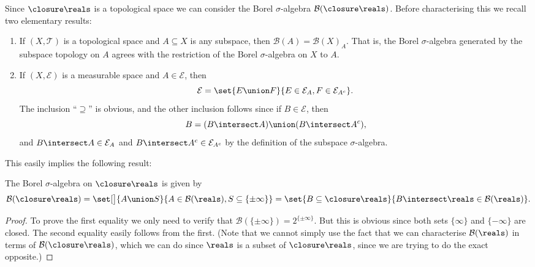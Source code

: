 \documentclass[article, a4paper, 11pt, oneside]{memoir}
\numberwithin{equation}{chapter}
\newcommand{\calT}{\mathcal{T}}
\newcommand{\calE}{\mathcal{E}}
\newcommand{\borel}{\mathcal{B}}
\begin{document}
Since $\exreals$ is a topological space we can consider the Borel $\sigma$-algebra $\borel(\exreals)$. Before characterising this we recall two elementary results:
%
\begin{enumerate}
    \item If $(X,\calT)$ is a topological space and $A \subseteq X$ is any subspace, then $\borel(A) = \borel(X)_A$. That is, the Borel $\sigma$-algebra generated by the subspace topology on $A$ agrees with the restriction of the Borel $\sigma$-algebra on $X$ to $A$.

    \item If $(X,\calE)$ is a measurable space and $A \in \calE$, then
    \begin{equation*}
        \calE
            = \set{E \union F}{E \in \calE_A, F \in \calE_{A^c}}.
    \end{equation*}
    The inclusion \enquote{$\supseteq$} is obvious, and the other inclusion follows since if $B \in \calE$, then
    \begin{equation*}
        B
            = (B \intersect A) \union (B \intersect A^c),
    \end{equation*}
    and $B \intersect A \in \calE_A$ and $B \intersect A^c \in \calE_{A^c}$ by the definition of the subspace $\sigma$-algebra.
\end{enumerate}
%
This easily implies the following result:

\begin{proposition}
    The Borel $\sigma$-algebra on $\exreals$ is given by
    \begin{equation*}
        \borel(\exreals)
            = \set[\big]{A \union S}{A \in \borel(\reals), S \subseteq \{\pm\infty\}}
            = \set{B \subseteq \exreals}{B \intersect \reals \in \borel(\reals)}.
    \end{equation*}
\end{proposition}

\begin{proof}
    To prove the first equality we only need to verify that $\borel(\{\pm\infty\}) = 2^{\{\pm\infty\}}$. But this is obvious since both sets $\{\infty\}$ and $\{-\infty\}$ are closed. The second equality easily follows from the first. (Note that we cannot simply use the fact that we can characterise $\borel(\reals)$ in terms of $\borel(\exreals)$, which we can do since $\reals$ is a subset of $\exreals$, since we are trying to do the exact opposite.)
\end{proof}


\nocite{*}

\printbibliography
\end{document}
